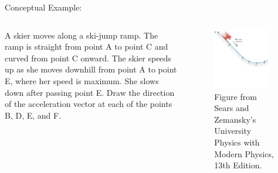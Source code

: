 \documentclass[]{beamer}
\begin{document}
\begin{frame}
    Conceptual Example:
    \vspace{3mm}


      \begin{columns}[c]
          \column{2in}  %
         
  
          A skier moves along a ski-jump ramp. The ramp is
          straight from point A to point C and curved from point C onward.
          The skier speeds up as she moves downhill from point A to point E,
          where her speed is maximum. She slows down after passing point
          E. Draw the direction of the acceleration vector at each of the
          points B, D, E, and F.
      
  
  
          \column{2.5in}
          
          \begin{figure}[h!]  
         \includegraphics[width=0.9\textwidth]{images/15.jpg}
          \caption{ {\tiny Figure from Sears and Zemansky's University Physics 
          with Modern Physics, 13th Edition.} }
       \end{figure}
       
       
       
          \end{columns}

          


\end{frame}
\end{document}
